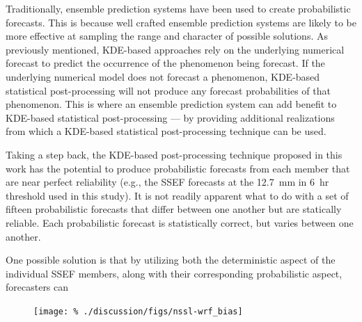 Traditionally, ensemble prediction systems have been used to create probabilistic forecasts.
This is because well crafted ensemble prediction systems are likely to be more effective at sampling the range and character of possible solutions.
As previously mentioned, KDE-based approaches rely on the underlying numerical forecast to predict the occurrence of the phenomenon being forecast.
If the underlying numerical model does not forecast a phenomenon, KDE-based statistical post-processing will not produce any forecast probabilities of that phenomenon.
This is where an ensemble prediction system can add benefit to KDE-based statistical post-processing --- by providing additional realizations from which a KDE-based statistical post-processing technique can be used.


Taking a step back, the KDE-based post-processing technique proposed in this work has the potential to produce probabilistic forecasts from each member that are near perfect reliability (e.g., the SSEF forecasts at the \mbox{12.7 mm} in \mbox{6 hr} threshold used in this study).
It is not readily apparent what to do with a set of fifteen probabilistic forecasts that differ between one another but are statically reliable.
Each probabilistic forecast is statistically correct, but varies between one another.


One possible solution is that by utilizing both the deterministic aspect of the individual SSEF members, along with their corresponding probabilistic aspect, forecasters can












\clearpage
\begin{figure}[cc]
    \centering
    \texttt{[image: \%
    ./discussion/figs/nssl-wrf\_bias]}\\
    \caption{}
    \label{nssl-wrf_bias}
\end{figure}
